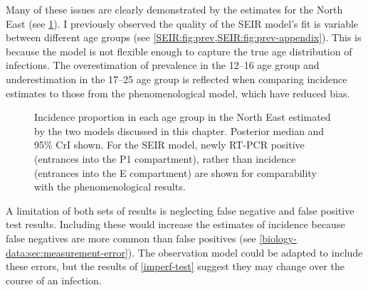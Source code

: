\documentclass[thesis.tex]{subfiles}
\begin{document}
Many of these issues are clearly demonstrated by the estimates for the North East (see \cref{transmission:fig:compare-NE}).
I previously observed the quality of the SEIR model's fit is variable between different age groups (see \cref{SEIR:fig:prev,SEIR:fig:prev-appendix}).
This is because the model is not flexible enough to capture the true age distribution of infections.
The overestimation of prevalence in the 12--16 age group and underestimation in the 17--25 age group is reflected when comparing incidence estimates to those from the phenomenological model, which have reduced bias.
\begin{figure}
    \caption[Comparing each models estimate of North East incidence proportion by age.]{%
        Incidence proportion in each age group in the North East estimated by the two models discussed in this chapter.
        Posterior median and 95\% CrI shown.
        For the SEIR model, newly RT-PCR positive (entrances into the P1 compartment), rather than incidence (entrances into the E compartment) are shown for comparability with the phenomenological results.
    }
    \label{transmission:fig:compare-NE}
\end{figure}

A limitation of both sets of results is neglecting false negative and false positive test results.
Including these would increase the estimates of incidence because false negatives are more common than false positives (see \cref{biology-data:sec:measurement-error}).
The observation model could be adapted to include these errors, but the results of \cref{imperf-test} suggest they may change over the course of an infection.
\end{document}
